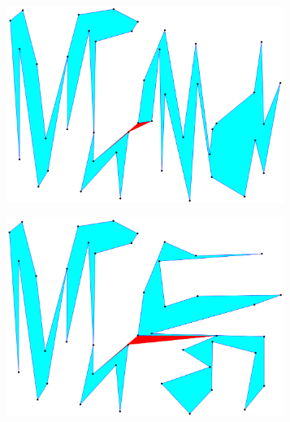\documentclass[conference]{IEEEtran}
\begin{document}
			\begin{figure}[htbp]
			\centering
			\begin{subfigure}{0.45\linewidth}
				\centering
				\includegraphics[width=0.99\textwidth]{fig1a.png}
				\caption{}
				\label{fig1a}
			\end{subfigure}
			\begin{subfigure}{0.45\linewidth}
				\centering
				\includegraphics[width=0.99\textwidth]{fig1b.png}
				\caption{}
				\label{fig1b}
			\end{subfigure}
			

\end{figure}
\end{document}
